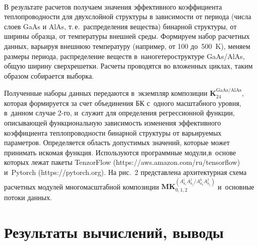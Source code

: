 \begin{multicols}{2}
     \begin{figure*} %
     \vspace*{1pt}
    \begin{center}  
  \mbox{%
 \epsfxsize=154.934mm 
 }
\end{center}
\vspace*{-6pt}
\vspace*{3pt}
     \end{figure*}
    
     В результате расчетов получаем значения эффективного коэффициента 
теплопроводности для двухслойной структуры в зависимости от периода (числа 
слоев GaAs и AlAs, т.\,е.\ распределения вещества) бинарной структуры, от 
ширины образца, от температуры внешней среды. Формируем набор расчетных 
данных, варьируя внешнюю температуру (например, от 100 до~500~K), меняем 
размеры периода, распределение веществ в~наногетероструктуре GaAs/AlAs, 
общую ширину сверхрешетки. Расчеты проводятся во вложенных циклах, таким 
образом собирается выборка. 
    
    Полученные наборы данных передаются в~экземпляр композиции 
$\boldsymbol{K}_{24}^{\mathrm{GaAs/AlAs}}$, которая формируется за счет 
объединения БК с~одного масштабного уровня, в~данном случае \mbox{2-го}, 
и~служит для определения регрессионной функции, описывающей 
функциональную за\-ви\-си\-мость изменения эффективного коэффициента 
теплопроводности бинарной структуры от варь\-и\-ру\-емых па\-ра\-мет\-ров. 
Определяется об\-ласть до\-пус\-ти\-мых значений, которые может принимать 
искомая функция. Используются программные модули,\linebreak в~основе которых лежат 
пакеты \mbox{TenzorFlow} ({\sf https://aws.amazon.com/ru/tensorflow}) и~\mbox{Pytorch} 
(https://pytorch.org). На рис.~2 пред\-став\-ле\-на архитектурная схема расчетных 
модулей многомасштабной композиции 
$\mathbf{MK}_{0,1,2}^{(A^i_{a_i}A^j_{a_j}/A^k_{a_k}A^j_{a_j})}$ 
и~основные потоки данных.
     

     
\section{Результаты вычислений, выводы}

\vspace*{-16pt}


\end{multicols}
